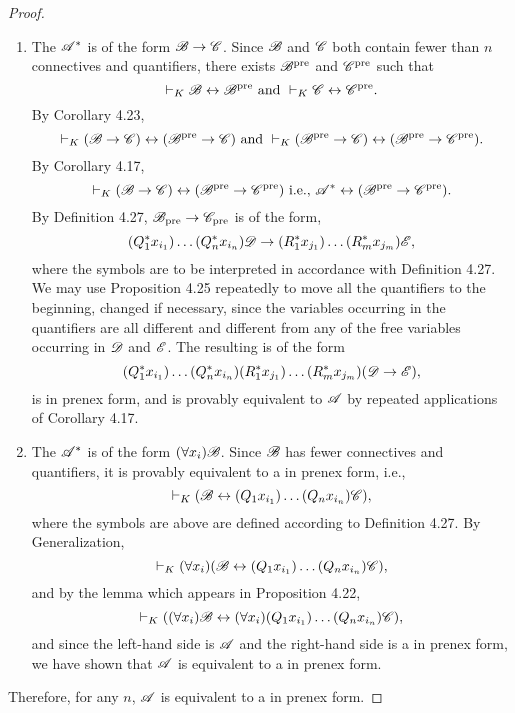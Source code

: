 \begin{proposition}
\begin{proof}
\begin{enumerate}
      \item The \wf{} \(\mathscr{A}^*\) is of the form \(\mathscr{B} \rightarrow \mathscr{C}\). Since \(\mathscr{B}\) and \(\mathscr{C}\) both contain fewer than \(n\) connectives and quantifiers, there exists \wfs{} \(\mathscr{B}^\text{pre}\) and \(\mathscr{C}^\text{pre}\) such that
        \[\vdash_{K} \mathscr{B} \leftrightarrow \mathscr{B}^\text{pre} \text{ and } \vdash_{K} \mathscr{C} \leftrightarrow \mathscr{C}^\text{pre}.\]
        By Corollary 4.23,
        \[\vdash_{K} (\mathscr{B} \rightarrow \mathscr{C}) \leftrightarrow (\mathscr{B}^\text{pre} \rightarrow \mathscr{C}) \text{ and } \vdash_{K} (\mathscr{B}^\text{pre} \rightarrow \mathscr{C}) \leftrightarrow (\mathscr{B}^\text{pre} \rightarrow \mathscr{C}^\text{pre}).\]
        By Corollary 4.17,
        \[\vdash_{K} (\mathscr{B} \rightarrow \mathscr{C}) \leftrightarrow (\mathscr{B}^\text{pre} \rightarrow \mathscr{C}^\text{pre}) \text{ i.e., } \mathscr{A}^* \leftrightarrow (\mathscr{B}^\text{pre} \rightarrow \mathscr{C}^\text{pre}).\]
        By Definition 4.27, \(\mathscr{B}_\text{pre} \rightarrow \mathscr{C}_\text{pre}\) is of the form,
        \[(Q^*_1 x_{i_1})\dots(Q^*_n x_{i_n})\mathscr{D} \rightarrow (R^*_1 x_{j_1})\dots(R^*_m x_{j_m})\mathscr{E},\]
        where the symbols are to be interpreted in accordance with Definition 4.27. We may use Proposition 4.25 repeatedly to move all the quantifiers to the beginning, changed if necessary, since the variables occurring in the quantifiers are all different and different from any of the free variables occurring in \(\mathscr{D}\) and \(\mathscr{E}\). The resulting \wf{} is of the form
        \[(Q^*_1 x_{i_1})\dots(Q^*_n x_{i_n})(R^*_1 x_{j_1})\dots(R^*_m x_{j_m})(\mathscr{D} \rightarrow \mathscr{E}),\]
        is in prenex form, and is provably equivalent to \(\mathscr{A}\) by repeated applications of Corollary 4.17.

      \item The \wf{} \(\mathscr{A}^*\) is of the form \((\forall x_i)\mathscr{B}\). Since \(\mathscr{B}\) has fewer connectives and quantifiers, it is provably equivalent to a \wf{} in prenex form, i.e.,
        \[\vdash_{K} (\mathscr{B} \leftrightarrow (Q_1 x_{i_1})\dots(Q_n x_{i_n})\mathscr{C}),\]
        where the symbols are above are defined according to Definition 4.27. By Generalization,
        \[\vdash_{K} (\forall x_i)(\mathscr{B} \leftrightarrow (Q_1 x_{i_1})\dots(Q_n x_{i_n})\mathscr{C}),\]
        and by the lemma which appears in Proposition 4.22,
        \[\vdash_{K} ((\forall x_i)\mathscr{B} \leftrightarrow (\forall x_i)(Q_1 x_{i_1})\dots(Q_n x_{i_n})\mathscr{C}),\]
        and since the left-hand side is \(\mathscr{A}\) and the right-hand side is a \wf{} in prenex form, we have shown that \(\mathscr{A}\) is equivalent to a \wf{} in prenex form.
    \end{enumerate}

    Therefore, for any \(n\), \(\mathscr{A}\) is equivalent to a \wf{} in prenex form.
  \end{proof}
\end{proposition}

